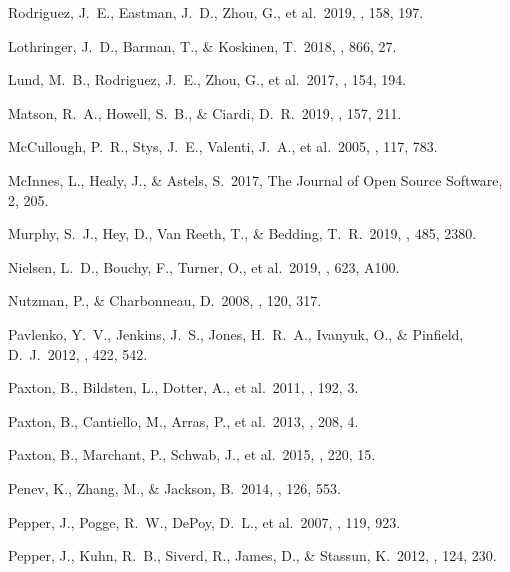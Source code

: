  Rodriguez, J.~E., Eastman, J.~D., Zhou, G., et al.\ 2019, \aj, 158, 197.



 Lothringer, J.~D., Barman, T., \& Koskinen, T.\ 2018, \apj, 866, 27.

 Lund, M.~B., Rodriguez, J.~E., Zhou, G., et al.\ 2017, \aj, 154, 194.

 Matson, R.~A., Howell, S.~B., \& Ciardi, D.~R.\ 2019, \aj, 157, 211.

 McCullough, P.~R., Stys, J.~E., Valenti, J.~A., et al.\ 2005, \pasp, 117, 783.

 McInnes, L., Healy, J., \& Astels, S.\ 2017, The Journal of Open Source Software, 2, 205.

 Murphy, S.~J., Hey, D., Van Reeth, T., \& Bedding, T.~R.\ 2019, \mnras, 485, 2380.

 Nielsen, L.~D., Bouchy, F., Turner, O., et al.\ 2019, \aap, 623, A100.

 Nutzman, P., \& Charbonneau, D.\ 2008, \pasp, 120, 317.

 Pavlenko, Y.~V., Jenkins, J.~S., Jones, H.~R.~A., Ivanyuk, O., \& Pinfield, D.~J.\ 2012, \mnras, 422, 542.

 Paxton, B., Bildsten, L., Dotter, A., et al.\ 2011, \apjs, 192, 3.

 Paxton, B., Cantiello, M., Arras, P., et al.\ 2013, \apjs, 208, 4.

 Paxton, B., Marchant, P., Schwab, J., et al.\ 2015, \apjs, 220, 15.

 Penev, K., Zhang, M., \& Jackson, B.\ 2014, \pasp, 126, 553.

 Pepper, J., Pogge, R.~W., DePoy, D.~L., et al.\ 2007, \pasp, 119, 923.

 Pepper, J., Kuhn, R.~B., Siverd, R., James, D., \& Stassun, K.\ 2012, \pasp, 124, 230.

